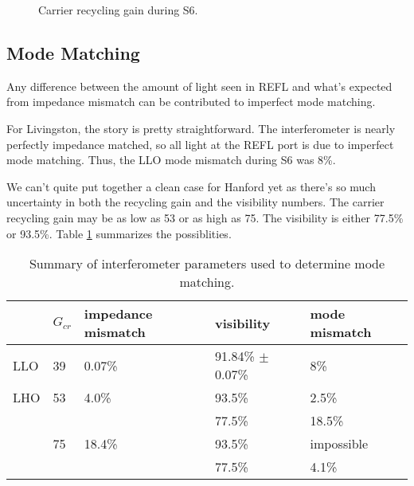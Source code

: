 \begin{figure}
\begin{centering}
\caption{Carrier recycling gain during S6.}
\label{fig:Gcr}
\end{centering}
\end{figure}



\subsection{Mode Matching}
Any difference between the amount of light seen in REFL and what's expected from impedance mismatch 
can be contributed to imperfect mode matching.

For Livingston, the story is pretty straightforward. The interferometer is nearly perfectly impedance 
matched, so all light at the REFL port is due to imperfect mode matching. Thus, the LLO mode 
mismatch during S6 was 8\%.

We can't quite put together a clean case for Hanford yet as there's so much uncertainty in both the 
recycling gain and the visibility numbers. The carrier recycling gain may be as low as 53 or as high as 75. 
The visibility is either 77.5\% or 93.5\%. Table \ref{table:Gcr}
summarizes the possiblities.

\begin{table}
\centering
\begin{tabular}{l l l l l}
& $G_{cr}$ & impedance mismatch & visibility & mode mismatch\\
\hline\hline
LLO & 39 & 0.07\% & 91.84\% $\pm$ 0.07\% & 8\%\\
LHO & 53 & 4.0\% & 93.5\% & 2.5\% \\
       &      &            & 77.5\% & 18.5\% \\
       & 75 & 18.4\% & 93.5\% & impossible\\
       &      &             & 77.5\% & 4.1\% \\ 
\hline
\end{tabular}
\caption{Summary of interferometer parameters used to determine mode matching.}
\label{table:Gcr}
\end{table}
